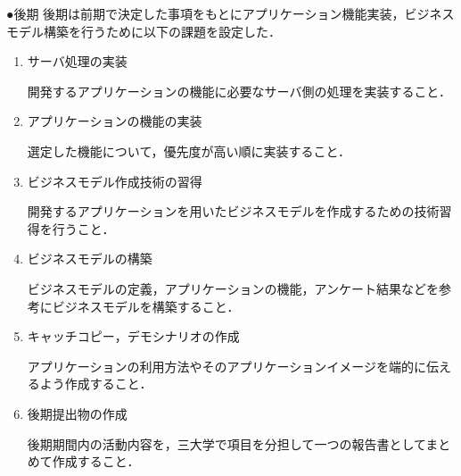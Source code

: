 ●後期
後期は前期で決定した事項をもとにアプリケーション機能実装，ビジネスモデル構築を行うために以下の課題を設定した．
\begin{enumerate}
\item サーバ処理の実装
\par 開発するアプリケーションの機能に必要なサーバ側の処理を実装すること．
\item アプリケーションの機能の実装
\par 選定した機能について，優先度が高い順に実装すること．
\item ビジネスモデル作成技術の習得
\par 開発するアプリケーションを用いたビジネスモデルを作成するための技術習得を行うこと．
\item ビジネスモデルの構築
\par ビジネスモデルの定義，アプリケーションの機能，アンケート結果などを参考にビジネスモデルを構築すること．
\item キャッチコピー，デモシナリオの作成
\par アプリケーションの利用方法やそのアプリケーションイメージを端的に伝えるよう作成すること．
\item 後期提出物の作成
\par 後期期間内の活動内容を，三大学で項目を分担して一つの報告書としてまとめて作成すること．
\end{enumerate}
